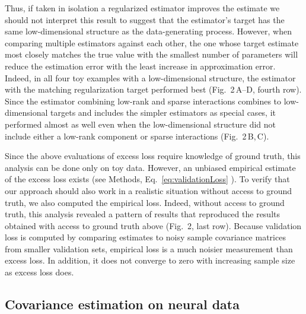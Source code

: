 Thus, if taken in isolation a regularized estimator improves the estimate we should not interpret this result to suggest that the estimator's target has the same low-dimensional structure as the data-generating process. However, when comparing multiple estimators against each other, the one whose target estimate most closely matches the true value with the smallest number of parameters will reduce the estimation error with the least increase in approximation error. Indeed, in all four toy examples with a low-dimensional structure, the estimator with the matching regularization target performed best (Fig.~2\,A--D, fourth row). Since the estimator combining low-rank and sparse interactions combines to low-dimensional targets and includes the simpler estimators as special cases, it performed almost as well even when the low-dimensional structure did not include either a low-rank component or sparse interactions (Fig.~2\,B,\,C).  

Since the above evaluations of excess loss require knowledge of ground truth, this analysis can be done only on toy data. However, an unbiased empirical estimate of the excess loss exists (see Methods, Eq.~\ref{eq:validationLoss} ).  To verify that our approach should also work in a realistic situation without access to ground truth, we also computed the empirical loss. Indeed, without access to ground truth, this analysis revealed a pattern of results that reproduced the results obtained with access to ground truth above (Fig.~2, last row). Because validation loss is computed by comparing estimates to noisy sample covariance matrices from smaller validation sets, empirical loss is a much noisier measurement than excess loss. In addition, it does not converge to zero with increasing sample size as excess loss does.




\subsection*{Covariance estimation on neural data}


